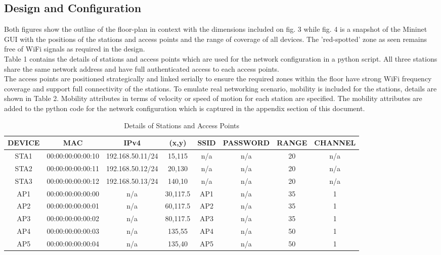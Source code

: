 \documentclass{article}
\begin{document}
\subsection{Design and Configuration}
Both figures show the outline of the floor-plan in context with the dimensions included on fig. 3 while fig. 4 is a snapshot of the Mininet GUI with the positions of the stations and access points and the range of coverage of all devices. The 'red-spotted' zone as seen remains free of WiFi signals as required in the design. \\ Table 1 contains the details of stations and access points which are used for the network configuration in a python script. All three stations share the same network address and have full authenticated access to each access points. \\ The access points are positioned strategically and linked serially to ensure the required zones within the floor have strong WiFi frequency coverage and support full connectivity of the stations. To emulate real networking scenario, mobility is included for the stations, details are shown in Table 2. Mobility attributes in terms of velocity or speed of motion for each station are specified. The mobility attributes are added to the python code for the network configuration which is captured in the appendix section of this document.
  	\begin{table}[h]
        		\centering
        		\begin{tabular}{|c|c|c|c|c|c|c|c|}
        			\hline
        			DEVICE & MAC & IPv4 & (x,y) & SSID & PASSWORD & RANGE & CHANNEL\\
        			\hline
        			STA1 & 00:00:00:00:00:10 & 192.168.50.11/24 & 15,115 & n/a & n/a & 20 & n/a \\
        			STA2 & 00:00:00:00:00:11 & 192.168.50.12/24 & 20,130 & n/a & n/a & 20 & n/a \\
       			STA3 & 00:00:00:00:00:12 & 192.168.50.13/24 & 140,10 & n/a & n/a & 20 & n/a \\
        			AP1 & 00:00:00:00:00:00 & n/a & 30,117.5 & AP1 & n/a & 35 & 1 \\
        			AP2 & 00:00:00:00:00:01 & n/a & 60,117.5 & AP2 & n/a & 35 & 1 \\
        			AP3 & 00:00:00:00:00:02 & n/a & 80,117.5 & AP3 & n/a & 35 & 1 \\
        			AP4 & 00:00:00:00:00:03 & n/a & 135,55 & AP4 & n/a & 50 & 1 \\
        			AP5 & 00:00:00:00:00:04 & n/a & 135,40 & AP5 & n/a & 50 & 1 \\
        			\hline
        		\end{tabular}
        \caption{Details of Stations and Access Points}
        \label{tab:1}
    	\end{table}
\end{document}
